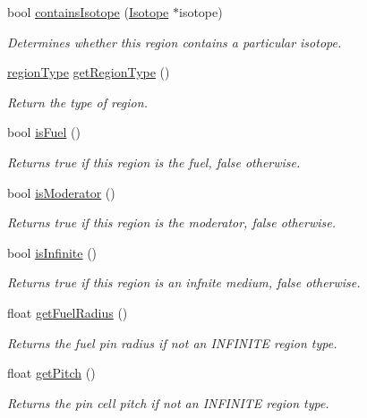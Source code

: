 \begin{DoxyCompactItemize}
bool \hyperlink{classRegion_a46eb443386a0f3003a28772f78e6de70}{contains\-Isotope} (\hyperlink{classIsotope}{Isotope} $\ast$isotope)
\begin{DoxyCompactList}\small\item\em Determines whether this region contains a particular isotope. \end{DoxyCompactList}\item 
\hyperlink{Region_8h_a2c25b4a3d851e2d45d7a435a73598323}{region\-Type} \hyperlink{classRegion_a79ac377684286e49a7ae54c5543c909c}{get\-Region\-Type} ()
\begin{DoxyCompactList}\small\item\em Return the type of region. \end{DoxyCompactList}\item 
bool \hyperlink{classRegion_a28071086d54cd10656a7dd887a9b7d7b}{is\-Fuel} ()
\begin{DoxyCompactList}\small\item\em Returns true if this region is the fuel, false otherwise. \end{DoxyCompactList}\item 
bool \hyperlink{classRegion_a07b3de22a98396471732b5a06478a2b6}{is\-Moderator} ()
\begin{DoxyCompactList}\small\item\em Returns true if this region is the moderator, false otherwise. \end{DoxyCompactList}\item 
bool \hyperlink{classRegion_a32c33d47e4cf99a839a7ea36c1f91b73}{is\-Infinite} ()
\begin{DoxyCompactList}\small\item\em Returns true if this region is an infnite medium, false otherwise. \end{DoxyCompactList}\item 
float \hyperlink{classRegion_a1eece240d2a03c92abd79c3fcb708fa1}{get\-Fuel\-Radius} ()
\begin{DoxyCompactList}\small\item\em Returns the fuel pin radius if not an I\-N\-F\-I\-N\-I\-T\-E region type. \end{DoxyCompactList}\item 
float \hyperlink{classRegion_a06dcc9cfe0a9d07594ad4baae3f426b9}{get\-Pitch} ()
\begin{DoxyCompactList}\small\item\em Returns the pin cell pitch if not an I\-N\-F\-I\-N\-I\-T\-E region type. \end{DoxyCompactList}\item 

\end{DoxyCompactItemize}
